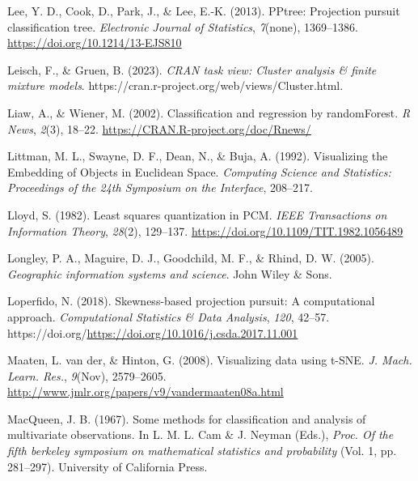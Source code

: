 \documentclass[
  letterpaper,
]{book}
\newlength{\cslhangindent}
\newlength{\cslentryspacingunit} %
\newenvironment{CSLReferences}[2] %
 {%
  \setlength{\parindent}{0pt}
  \ifodd #1
  \let\oldpar\par
  \def\par{\hangindent=\cslhangindent\oldpar}
  \fi
  \setlength{\parskip}{#2\cslentryspacingunit}
 }%
 {}
\begin{document}
\begin{CSLReferences}{1}{0}
\leavevmode{}%
Lee, Y. D., Cook, D., Park, J., \& Lee, E.-K. (2013). {PPtree:
Projection pursuit classification tree}. \emph{Electronic Journal of
Statistics}, \emph{7}(none), 1369--1386.
\url{https://doi.org/10.1214/13-EJS810}

\leavevmode{}%
Leisch, F., \& Gruen, B. (2023). \emph{CRAN task view: Cluster analysis
\& finite mixture models}.
https://cran.r-project.org/web/views/Cluster.html.

\leavevmode{}%
Liaw, A., \& Wiener, M. (2002). Classification and regression by
randomForest. \emph{R News}, \emph{2}(3), 18--22.
\url{https://CRAN.R-project.org/doc/Rnews/}

\leavevmode{}%
Littman, M. L., Swayne, D. F., Dean, N., \& Buja, A. (1992). Visualizing
the {E}mbedding of {O}bjects in {E}uclidean {S}pace. \emph{Computing
Science and Statistics: Proceedings of the 24th Symposium on the
Interface}, 208--217.

\leavevmode{}%
Lloyd, S. (1982). Least squares quantization in PCM. \emph{IEEE
Transactions on Information Theory}, \emph{28}(2), 129--137.
\url{https://doi.org/10.1109/TIT.1982.1056489}

\leavevmode{}%
Longley, P. A., Maguire, D. J., Goodchild, M. F., \& Rhind, D. W.
(2005). \emph{Geographic information systems and science}. John Wiley \&
Sons.

\leavevmode{}%
Loperfido, N. (2018). Skewness-based projection pursuit: A computational
approach. \emph{Computational Statistics \& Data Analysis}, \emph{120},
42--57. https://doi.org/\url{https://doi.org/10.1016/j.csda.2017.11.001}

\leavevmode{}%
Maaten, L. van der, \& Hinton, G. (2008). Visualizing data using
{t-SNE}. \emph{J. Mach. Learn. Res.}, \emph{9}(Nov), 2579--2605.
\url{http://www.jmlr.org/papers/v9/vandermaaten08a.html}

\leavevmode{}%
MacQueen, J. B. (1967). Some methods for classification and analysis of
multivariate observations. In L. M. L. Cam \& J. Neyman (Eds.),
\emph{Proc. Of the fifth berkeley symposium on mathematical statistics
and probability} (Vol. 1, pp. 281--297). University of California Press.


\end{CSLReferences}
\end{document}
